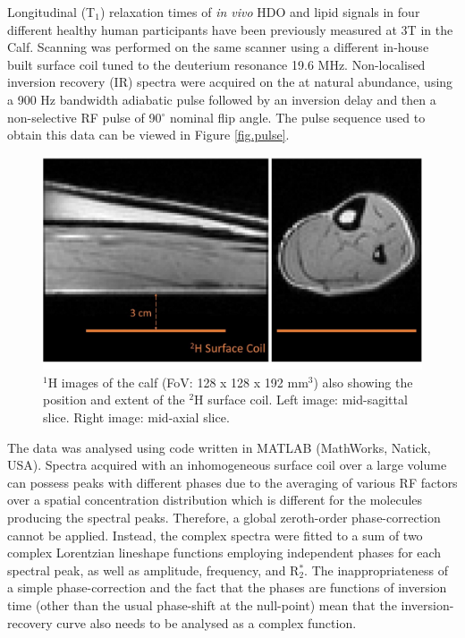 \documentclass[class=article, crop=false]{standalone}
\begin{document}
Longitudinal (T$_1$) relaxation times of \textit{in vivo} HDO and lipid signals in four different healthy human participants have been previously measured at 3T in the Calf\cite{Damion2021NaturalT}. Scanning was performed on the same scanner using a different in-house built surface coil tuned to the deuterium resonance 19.6 MHz. Non-localised inversion recovery (IR) spectra were acquired on the at natural abundance, using a 900 Hz bandwidth adiabatic pulse followed by an inversion delay and then a non-selective RF pulse of 90$^\circ$ nominal flip angle. The pulse sequence used to obtain this data can be viewed in Figure \ref{fig.pulse}. 

\begin{figure}
    \centering
    \includegraphics[width=1\textwidth]{Figures/Lipid/Coil.jpg}
    \caption{$^1$H images of the calf (FoV: 128 x 128 x 192 mm$^3$) also showing the position and extent of the $^2$H surface coil. Left image: mid-sagittal slice. Right image: mid-axial slice.  }
    \label{fig:Lip:Coil}
\end{figure}

The data was analysed using code written in MATLAB (MathWorks, Natick, USA). Spectra acquired with an inhomogeneous surface coil over a large volume can possess peaks with different phases due to the averaging of various RF factors over a spatial concentration distribution which is different for the molecules producing the spectral peaks. Therefore, a global zeroth-order phase-correction cannot be applied. Instead, the complex spectra were fitted to a sum of two complex Lorentzian lineshape functions employing independent phases for each spectral peak, as well as amplitude, frequency, and R$_2^*$. The inappropriateness of a simple phase-correction and the fact that the phases are functions of inversion time (other than the usual phase-shift at the null-point) mean that the inversion-recovery curve also needs to be analysed as a complex function.
\end{document}
